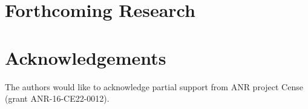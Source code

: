 \documentclass[a0,portrait,20pt]{a0poster}
\begin{document}
\begin{multicols}{2}

\section*{Forthcoming Research}




\section*{Acknowledgements}


The authors would like to acknowledge partial support from ANR project Cense (grant ANR-16-CE22-0012).


\end{multicols}
\end{document}
